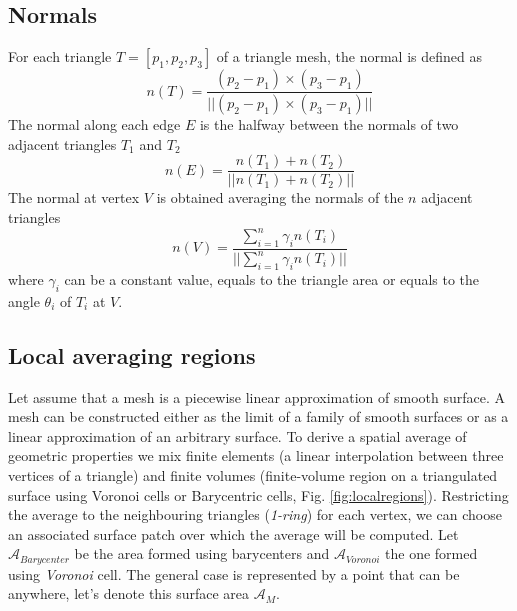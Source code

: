 \subsection{Normals}
For each triangle $T=[p_1, p_2, p_3]$ of a triangle mesh, the normal is defined as
$$n(T) = \frac{(p_2 - p_1) \times (p_3 - p_1)}{||(p_2 - p_1) \times (p_3 - p_1)||}$$
The normal along each edge $E$ is the halfway between the normals of two adjacent triangles $T_1$ and $T_2$
$$n(E) = \frac{n(T_1) + n(T_2)}{||n(T_1) + n(T_2)||}$$
The normal at vertex $V$ is obtained averaging the normals of the $n$ adjacent triangles
$$n(V) = \frac{\sum_{i =1}^n \gamma_i n(T_i)}{||\sum_{i =1}^n \gamma_i n(T_i)||}$$
where $\gamma_i$ can be a constant value, equals to the triangle area or equals to the angle $\theta_i$ of $T_i$ at $V$.
\cite{geometryprocessing}

\subsection{Local averaging regions} \label{section:localaveraging}
Let assume that a mesh is a piecewise linear approximation of smooth surface.
A mesh can be constructed either as the limit of a family of smooth surfaces or as a linear approximation of an arbitrary surface. To derive a spatial average of geometric properties we mix finite elements (a linear interpolation between three vertices of a triangle) and finite volumes (finite-volume region on a triangulated surface using Voronoi cells or Barycentric cells, Fig. \ref{fig:localregions}). Restricting the average to the neighbouring triangles (\textit{1-ring}) for each vertex, we can choose an associated surface patch over which the average will be computed.
Let $\mathcal{A}_{Barycenter}$ be the area formed using barycenters and $\mathcal{A}_{Voronoi}$ the one formed using \textit{Voronoi} cell. The general case is represented by a point that can be anywhere, let's denote this surface area $\mathcal{A}_M$.

